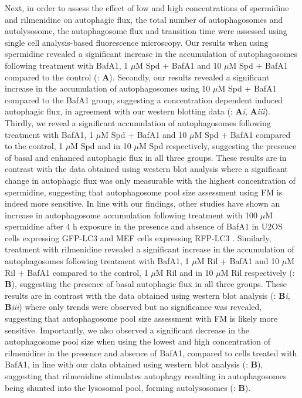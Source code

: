 {Next, in order to assess the effect of low and high concentrations of spermidine and rilmenidine on autophagic flux, the total number of autophagosomes and autolysosome, the autophagosome flux and transition time \citep{loos2014} were assessed using single cell analysis-based fluorescence microscopy. Our results when using spermidine revealed a significant increase in the accumulation of autophagosomes following treatment with BafA1, 1 $\mu$M Spd + BafA1 and 10 $\mu$M Spd + BafA1 compared to the control (: \textbf{A}). Secondly, our results revealed a significant increase in the accumulation of autophagosomes using 10 $\mu$M Spd + BafA1 compared to the BafA1 group, suggesting a concentration dependent induced autophagic flux, in agreement with our western blotting data (: \textbf{A}\textit{i}, \textbf{A}\textit{iii}).  Thirdly, we reveal a significant accumulation of autophagosomes following treatment with BafA1, 1 $\mu$M Spd + BafA1 and 10 $\mu$M Spd + BafA1 compared to the control, 1 $\mu$M Spd and in 10 $\mu$M Spd respectively, suggesting the presence of basal and enhanced autophagic flux in all three groups. These results are in contrast with the data obtained using western blot analysis where a significant change in autophagic flux was only measurable with the highest concentration of spermidine, suggesting that autophagosome pool size assessment using FM is indeed more sensitive. In line with our findings, other studies have shown an increase in autophagosome accumulation following treatment with 100 $\mu$M spermidine after 4 h exposure in the presence and absence of BafA1 in U2OS cells expressing GFP-LC3  \citep{Pietrocola2015} and MEF cells expressing RFP-LC3 \citep{Yue2017}. Similarly, treatment with rilmenidine revealed a significant increase in the accumulation of autophagosomes following treatment with BafA1, 1 $\mu$M Ril + BafA1 and 10 $\mu$M Ril + BafA1 compared to the control, 1 $\mu$M Ril and in 10 $\mu$M Ril respectively (: \textbf{B}), suggesting the presence of basal autophagic flux in all three groups. These results are in contrast with the data obtained using western blot analysis (: \textbf{B}\textit{i}, \textbf{B}\textit{iii}) where only trends were observed but no significance was revealed, suggesting that autophagosome pool size assessment with FM is likely more sensitive.  Importantly, we also observed a significant decrease in the autophagosome pool size when using the lowest and high concentration of rilmenidine in the presence and absence of BafA1, compared to cells treated with BafA1, in line with our data obtained using western blot analysis (: \textbf{B}), suggesting that rilmenidine stimulates autophagy resulting in autophagosomes being shunted into the lysosomal pool, forming autolysosomes (: \textbf{B}). 

}
